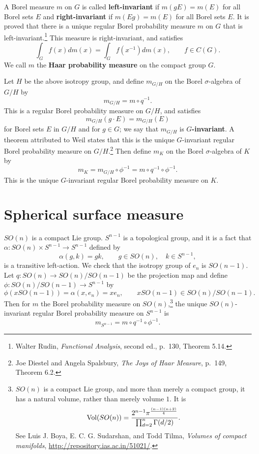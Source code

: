 \documentclass{article}
\newcommand{\Vol}{\ensuremath\mathrm{Vol}}
\theoremstyle{definition}
\begin{document}
A Borel measure $m$ on $G$ is called \textbf{left-invariant} if $m(gE)=m(E)$ for all Borel sets $E$ and 
\textbf{right-invariant} if $m(Eg)=m(E)$ for all Borel sets $E$. 
It is proved that there is a unique regular Borel probability measure $m$ on $G$ 
that is left-invariant.\footnote{Walter Rudin, {\em Functional Analysis}, second ed., p.~130, Theorem 5.14.}
This measure is right-invariant, and satisfies
\[
\int_G f(x) dm(x) = \int_G f(x^{-1}) dm(x),\qquad f \in C(G).
\]
We call $m$ the \textbf{Haar probability measure}  on the compact group $G$.

Let $H$ be the above isotropy group, and
define $m_{G/H}$ on the Borel $\sigma$-algebra of $G/H$ by 
\[
m_{G/H} = m \circ q^{-1}.
\]
This is a regular Borel probability measure on $G/H$, and satisfies
\[
m_{G/H}(g\cdot E) = m_{G/H}(E)
\]
 for Borel sets $E$ in $G/H$ and
for $g \in G$; we say that $m_{G/H}$ is \textbf{$G$-invariant}.
A theorem attributed to Weil states that this is the unique $G$-invariant regular Borel probability measure on $G/H$.\footnote{Joe Diestel and Angela Spalsbury, {\em The Joys of Haar Measure},
p.~149, Theorem 6.2.}
Then define $m_K$ on the Borel $\sigma$-algebra of $K$ by 
\[
m_K = m_{G/H} \circ \phi^{-1} = m\circ q^{-1} \circ \phi^{-1}.
\]
This is the unique $G$-invariant regular Borel probability measure on $K$.


\section{Spherical surface measure}
$SO(n)$ is a compact Lie group.
$S^{n-1}$ is a topological group, and
it is a fact that $\alpha:SO(n) \times S^{n-1} \to S^{n-1}$ defined by
\[
\alpha(g,k) = gk,\qquad g \in SO(n),\quad k \in S^{n-1},
\]
is a transitive left-action. We check that the isotropy group of $e_n$ is $SO(n-1)$. Let $q:SO(n) \to SO(n)/SO(n-1)$ be the projection
map and define $\phi:SO(n)/SO(n-1) \to S^{n-1}$ by
\[
\phi(x SO(n-1)) = \alpha(x,e_n) = xe_n,\qquad xSO(n-1) \in SO(n)/SO(n-1).
\]
Then for $m$ the Borel probability measure on $SO(n)$,\footnote{$SO(n)$ is a compact Lie group, and 
more than merely a compact group, it has a natural volume, rather than merely volume $1$. It is
\[
\Vol(SO(n)) = \frac{2^{n-1} \pi^{\frac{(n-1)(n+2)}{4}}}{\prod_{d=2}^n \Gamma(d/2)}.
\]
See
Luis J. Boya,  E. C. G. Sudarshan, and Todd Tilma,
{\em Volumes of compact manifolds},
 \url{http://repository.ias.ac.in/51021/}.}
 the unique $SO(n)$-invariant regular Borel probability
measure on $S^{n-1}$ is
\begin{equation}
m_{S^{n-1}} = m \circ q^{-1} \circ \phi^{-1}.
\label{mSn}
\end{equation}
\end{document}
